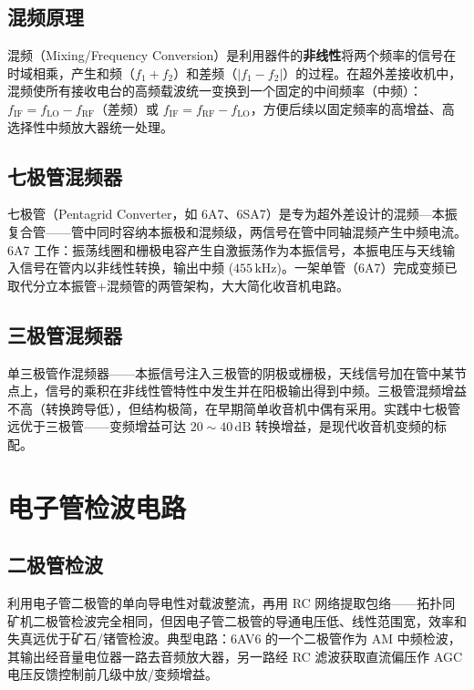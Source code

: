\documentclass[12pt,UTF8]{ctexbook}
\begin{document}
\subsection{混频原理}

混频（Mixing/Frequency Conversion）是利用器件的\textbf{非线性}将两个频率的信号在时域相乘，产生和频（$f_1+f_2$）和差频（$|f_1-f_2|$）的过程。在超外差接收机中，混频使所有接收电台的高频载波统一变换到一个固定的中间频率（中频）：$f_{\text{IF}} = f_{\text{LO}} - f_{\text{RF}}$（差频）或 $f_{\text{IF}} = f_{\text{RF}} - f_{\text{LO}}$，方便后续以固定频率的高增益、高选择性中频放大器统一处理。

\subsection{七极管混频器}

七极管（Pentagrid Converter，如 6A7、6SA7）是专为超外差设计的混频—本振复合管——管中同时容纳本振极和混频级，两信号在管中同轴混频产生中频电流。6A7 工作：振荡线圈和栅极电容产生自激振荡作为本振信号，本振电压与天线输入信号在管内以非线性转换，输出中频 ($455\,\mathrm{kHz}$)。一架单管（6A7）完成变频已取代分立本振管+混频管的两管架构，大大简化收音机电路。

\subsection{三极管混频器}

单三极管作混频器——本振信号注入三极管的阴极或栅极，天线信号加在管中某节点上，信号的乘积在非线性管特性中发生并在阳极输出得到中频。三极管混频增益不高（转换跨导低），但结构极简，在早期简单收音机中偶有采用。实践中七极管远优于三极管——变频增益可达 $20\sim40\,\mathrm{dB}$ 转换增益，是现代收音机变频的标配。

\section{电子管检波电路}
\label{sec:tube_detector}

\subsection{二极管检波}

利用电子管二极管的单向导电性对载波整流，再用 RC 网络提取包络——拓扑同矿机二极管检波完全相同，但因电子管二极管的导通电压低、线性范围宽，效率和失真远优于矿石/锗管检波。典型电路：6AV6 的一个二极管作为 AM 中频检波，其输出经音量电位器一路去音频放大器，另一路经 RC 滤波获取直流偏压作 AGC 电压反馈控制前几级中放/变频增益。
\end{document}
